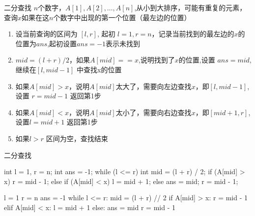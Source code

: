 \documentclass[aspectratio=169,xcolor=dvipsnames]{beamer}
\begin{document}
\begin{frame}[fragile]{二分查找}
    $n$个数字，$A[1],A[2],\ldots,A[n]$,从小到大排序，可能有重复的元素，查询$x$如果在这$n$个数字中出现的第一个位置（最左边的位置）
    \begin{enumerate}
        \item 设当前查询的区间为 $[l,r]$, 起初 $l=1,r=n$，记录当前找到的最左边的$x$的位置为$ans$,起初设置$ans=-1$表示未找到
        \item $mid=(l+r)/2$，如果$A[mid]==x$,说明找到了$x$的位置,设置 $ans=mid$,继续在$[l,mid-1]$ 中查找x的位置
        \item 如果$A[mid]>x$，说明$A[mid]$太大了，需要向左边查找$x$，即$[l,mid-1]$, \\设置 $r=mid-1$ 返回第1步
        \item 如果$A[mid]<x$，说明$A[mid]$太小了，需要向右边查找$x$，即$[mid+1,r]$,\\设置$l=mid+1$ 返回第1步
        \item 如果$l>r$ 区间为空，查找结束
    \end{enumerate}
\end{frame}


\begin{frame}[fragile]{二分查找}
    \begin{minipage}{0.45\textwidth}
        \centering
        \begin{cppcode}
    int l = 1, r = n;
    int ans = -1;
    while (l <= r) {
        int mid = (l + r) / 2;
        if (A[mid] > x) {
            r = mid - 1;
        } else if (A[mid] < x) {
            l = mid + 1;
        } else {
            ans = mid;
            r = mid - 1;
        }
    }
        \end{cppcode}
    \end{minipage}%
    \hfill
    \begin{minipage}{0.45\textwidth}
        \centering
        \begin{pycode}
    l = 1
    r = n
    ans = -1
    while l <= r:
        mid = (l + r) // 2
        if A[mid] > x:
            r = mid - 1
        elif A[mid] < x:
            l = mid + 1
        else:
            ans = mid
            r = mid - 1
        \end{pycode}
    \end{minipage}
    
\end{frame}
    
\end{document}
